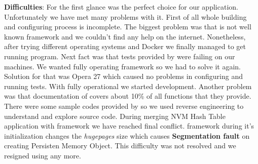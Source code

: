             \textbf{Difficulties}:
                For the first glance \Seastar was the perfect choice for our application.
                Unfortunately we have met many problems with it.
                First of all whole building and configuring process is incomplete.
                The biggest problem was that \Seastar is not well known framework and we couldn't find any help on the internet.
                Nonetheless, after trying different operating systems and Docker we finally managed to get running \Seastar program.
                Next fact was that tests provided by \Seastar were failing on our machines.
                We wanted fully operating framework so we had to solve it again.
                Solution for that was Opera 27 which caused no problems in configuring and running tests.
                With fully operational \Seastar we started development.
                Another problem was that documentation of \Seastar covers about 10\% of all functions that they provide.
                There were some sample codes provided by \Seastar so we used reverse engineering to understand and explore source code.
                During merging NVM Hash Table application with \Seastar framework we have reached final conflict.
                \Seastar framework during it's initialization changes the \textit{hugepages}\cite{Hugepages} size which causes \textbf{Segmentation fault} on creating Persisten Memory Object.
                This difficulty was not resolved and we resigned using \Seastar any more.


